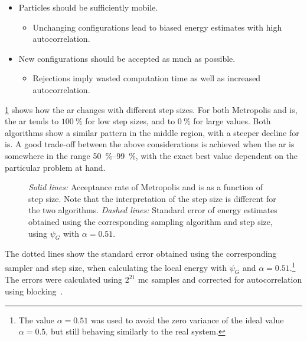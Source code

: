 \documentclass[Thesis.tex]{subfiles}
\begin{document}
\begin{itemize}
\item Particles should be sufficiently mobile.
  \begin{itemize}
  \item Unchanging configurations lead to biased energy estimates with high
    autocorrelation.
  \end{itemize}
\item New configurations should be accepted as much as possible.
  \begin{itemize}
  \item Rejections imply wasted computation time as well as increased autocorrelation.
  \end{itemize}
\end{itemize}


\cref{fig:verify-sampling-step} shows how the \gls{ar} changes with
different step sizes. For both Metropolis and \gls{is}, the \gls{ar} tends
to $\SI{100}{\percent}$ for low step sizes, and to $\SI{0}{\percent}$ for large
values. Both algorithms show a similar pattern in the middle region, with
a steeper decline for \gls{is}. A good trade-off between the above
considerations is achieved when the \gls{ar} is somewhere in the range
\SIrange{50}{99}{\percent}, with the exact best value dependent on the
particular problem at hand.

\begin{figure}[h]
  \centering
    \resizebox{\linewidth}{!}{%
      
    }
    \caption[Comparison of sampling strategies]{\label{fig:verify-sampling-step}\emph{Solid lines:} Acceptance rate of
    Metropolis and \gls{is} as a function of step size. Note that the
  interpretation of the step size is different for the two algorithms. \emph{Dashed
  lines:} Standard error of energy estimates obtained using the corresponding
  sampling algorithm and step size, using $\psi_G$ with $\alpha=0.51$.}
\end{figure}


The dotted lines show the standard error obtained using the
corresponding sampler and step size, when calculating the local energy with
$\psi_G$ and $\alpha=0.51$.\footnote{The value $\alpha=0.51$ was used to avoid
  the zero variance of the ideal value $\alpha=0.5$, but still behaving
  similarly to the real system.} The errors were calculated using $2^{21}$ \gls{mc}
samples and corrected for autocorrelation using blocking~\cite{Jonsson-2018}.
\end{document}
